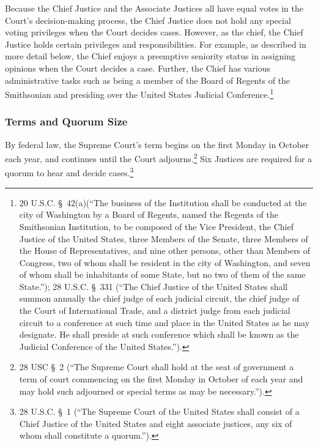 Because the Chief Justice and the Associate Justices all have equal votes in the Court's decision-making process, the Chief Justice does not hold any special voting privileges when the Court decides cases.  However, as the chief, the Chief Justice holds certain privileges and responsibilities.  For example, as described in more detail below, the Chief enjoys a preemptive seniority status in assigning opinions when the Court decides a case.  Further, the Chief has various administrative tasks such as being a member of the Board of Regents of the Smithsonian and presiding over the United States Judicial Conference.\footnote{20 U.S.C. \S\ 42(a)(``The business of the Institution shall be conducted at the city of Washington by a Board of Regents, named the Regents of the Smithsonian Institution, to be composed of the Vice President, the Chief Justice of the United States, three Members of the Senate, three Members of the House of Representatives, and nine other persons, other than Members of Congress, two of whom shall be resident in the city of Washington, and seven of whom shall be inhabitants of some State, but no two of them of the same State.''); 28 U.S.C. \S\ 331 (``The Chief Justice of the United States shall summon annually the chief judge of each judicial circuit, the chief judge of the Court of International Trade, and a district judge from each judicial circuit to a conference at such time and place in the United States as he may designate. He shall preside at such conference which shall be known as the Judicial Conference of the United States.'').}

\subsubsection{Terms and Quorum Size}
By federal law, the Supreme Court's term  begins on the first Monday in October each year, and continues until the Court adjourns.\footnote{28 USC \S\ 2 (``The Supreme Court shall hold at the seat of government a term of court commencing on the first Monday in October of each year and may hold such adjourned or special terms as may be necessary.'').}
Six Justices are required for a quorum to hear and decide cases.\footnote{28 U.S.C. \S\ 1 (``The Supreme Court of the United States shall consist of a Chief Justice of the United States and eight associate justices, any six of whom shall constitute a quorum.'').}  


